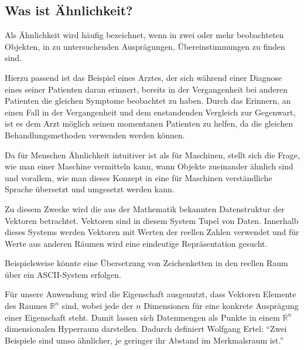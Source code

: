 \documentclass[fontsize=11pt]{scrartcl}
\begin{document}
            \subsection{Was ist Ähnlichkeit?}
                Als Ähnlichkeit wird häufig bezeichnet, wenn in zwei oder mehr beobachteten Objekten, in zu untersuchenden Ausprägungen, Übereinstimmungen zu finden sind.\par
                Hierzu passend ist das Beispiel eines Arztes, der sich während einer Diagnose eines seiner Patienten daran erinnert, bereits in der Vergangenheit bei anderen Patienten die gleichen Symptome beobachtet zu haben.\cite{ertel2016} Durch das Erinnern, an einen Fall in der Vergangenheit und dem enstandenden Vergleich zur Gegenwart, ist es dem Arzt möglich seinen momentanen Patienten zu helfen, da die gleichen Behandlungsmethoden verwenden werden können.\par
                Da für Menschen Ähnlichkeit intuitiver ist als für Maschinen, stellt sich die Frage, wie man einer Maschine vermitteln kann, wann Objekte zueinander ähnlich sind und vorallem, wie man dieses Konzept in eine für Maschinen verständliche Sprache übersetzt und umgesetzt werden kann.\par
                Zu diesem Zwecke wird die aus der Mathematik bekannten Datenstruktur der Vektoren betrachtet.
                Vektoren sind in diesem System Tupel von Daten. Innerhalb dieses Systems werden Vektoren mit Werten der reellen Zahlen verwendet und für Werte aus anderen Räumen wird eine eindeutige Repräsentation gesucht.\par Beispielsweise könnte eine Übersetzung von Zeichenketten in den reellen Raum über ein ASCII-System erfolgen.\par 
                Für unsere Anwendung wird die Eigenschaft ausgenutzt, dass Vektoren Elemente des Raumes $\mathbb{R}^n$ sind, wobei jede der $n$ Dimensionen für eine konkrete Ausprägung einer Eigenschaft steht. Damit lassen sich Datenmengen als Punkte in einem $\mathbb{R}^n$ dimensionalen Hyperraum darstellen. Dadurch definiert Wolfgang Ertel: “Zwei Beispiele sind umso ähnlicher, je geringer ihr Abstand im Merkmalsraum ist.”\cite{ertel2016_p207} %
\end{document}
